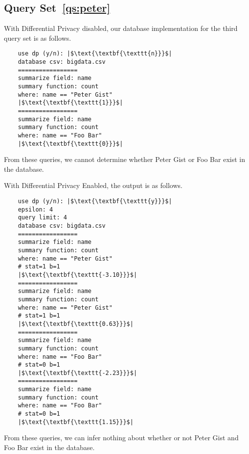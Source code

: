 \documentclass[conference,11pt]{IEEEtran}
\begin{document}
\subsection{Query Set~\ref{qs:peter}}
With Differential Privacy disabled, our database implementation for the third
query set is as follows.
\begin{verbatim}
    use dp (y/n): |$\text{\textbf{\texttt{n}}}$|
    database csv: bigdata.csv
    =================
    summarize field: name
    summary function: count
    where: name == "Peter Gist"
    |$\text{\textbf{\texttt{1}}}$|
    =================
    summarize field: name
    summary function: count
    where: name == "Foo Bar"
    |$\text{\textbf{\texttt{0}}}$|
\end{verbatim}
From these queries, we cannot determine whether Peter Gist or Foo Bar exist 
in the database.

With Differential Privacy Enabled, the output is as follows.
\begin{verbatim}
    use dp (y/n): |$\text{\textbf{\texttt{y}}}$|
    epsilon: 4
    query limit: 4
    database csv: bigdata.csv
    =================
    summarize field: name
    summary function: count
    where: name == "Peter Gist"
    # stat=1 b=1
    |$\text{\textbf{\texttt{-3.10}}}$|
    =================
    summarize field: name
    summary function: count
    where: name == "Peter Gist"
    # stat=1 b=1
    |$\text{\textbf{\texttt{0.63}}}$|
    =================
    summarize field: name
    summary function: count
    where: name == "Foo Bar"
    # stat=0 b=1
    |$\text{\textbf{\texttt{-2.23}}}$|
    =================
    summarize field: name
    summary function: count
    where: name == "Foo Bar"
    # stat=0 b=1
    |$\text{\textbf{\texttt{1.15}}}$|
\end{verbatim}
From these queries, we can infer nothing about whether or not Peter Gist and
Foo Bar exist in the database.

\end{document}
